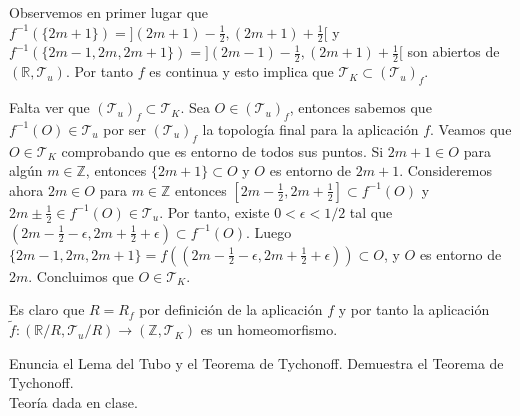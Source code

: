 \documentclass[12pt]{article}
\begin{document}
\begin{ejercicio}
\begin{enumerate}[label=\alph*)]
                Observemos en primer lugar que $f^{-1}(\{2m+1\}) = ](2m+1) - \frac{1}{2}, (2m+1) + \frac{1}{2}[$ y $f^{-1}(\{2m-1, 2m, 2m+1\}) = ](2m-1) - \frac{1}{2}, (2m+1) + \frac{1}{2}[$ son abiertos de $(\mathbb{R}, \mathcal{T}_u)$. Por tanto $f$ es continua y esto implica que $\mathcal{T}_K \subset (\mathcal{T}_u)_f$.
                
                Falta ver que $(\mathcal{T}_u)_f \subset \mathcal{T}_K$. Sea $O \in (\mathcal{T}_u)_f$, entonces sabemos que $f^{-1}(O) \in \mathcal{T}_u$ por ser $(\mathcal{T}_u)_f$ la topología final para la aplicación $f$. Veamos que $O \in \mathcal{T}_K$ comprobando que es entorno de todos sus puntos. Si $2m+1 \in O$ para algún $m \in \mathbb{Z}$, entonces $\{2m+1\} \subset O$ y $O$ es entorno de $2m+1$. Consideremos ahora $2m \in O$ para $m \in \mathbb{Z}$ entonces $[2m - \frac{1}{2}, 2m + \frac{1}{2}] \subset f^{-1}(O)$ y $2m \pm \frac{1}{2} \in f^{-1}(O) \in \mathcal{T}_u$. Por tanto, existe $0 < \epsilon < 1/2$ tal que $(2m - \frac{1}{2} - \epsilon, 2m + \frac{1}{2} + \epsilon) \subset f^{-1}(O)$. Luego $\{2m-1, 2m, 2m+1\} = f((2m - \frac{1}{2} - \epsilon, 2m + \frac{1}{2} + \epsilon)) \subset O$, y $O$ es entorno de $2m$. Concluimos que $O \in \mathcal{T}_K$.
                
                Es claro que $R = R_f$ por definición de la aplicación $f$ y por tanto la aplicación $\tilde{f}: (\mathbb{R}/R, \mathcal{T}_u/R) \rightarrow (\mathbb{Z}, \mathcal{T}_K)$ es un homeomorfismo.
        \end{enumerate}
    \end{ejercicio}

    \begin{ejercicio}
        Enuncia el Lema del Tubo y el Teorema de Tychonoff. Demuestra el Teorema de Tychonoff. \\
        Teoría dada en clase.
    \end{ejercicio}
\end{document}
